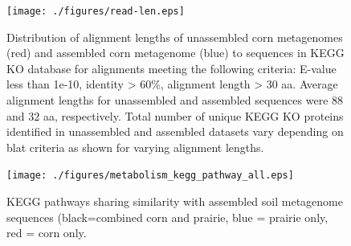 \documentclass{pnastwo}
\begin{document}
\begin{figure}
\begin{center}
\centerline{\texttt{[image: ./figures/read-len.eps]}}
\caption{Distribution of alignment lengths of unassembled corn metagenomes (red) and assembled corn metagenome (blue) to sequences in KEGG KO database for alignments meeting the following criteria:  E-value less than 1e-10, identity > 60\%, alignment length > 30 aa.  Average alignment lengths for unassembled and assembled sequences were 88 and 32 aa, respectively.   Total number of unique  KEGG KO proteins identified in unassembled and assembled datasets vary depending on blat criteria as shown for varying alignment lengths.}
\label{length-aln}
\end{center}
\end{figure}


\begin{figure}
\begin{center}
\centerline{\texttt{[image: ./figures/metabolism\_kegg\_pathway\_all.eps]}}
\caption{KEGG pathways sharing similarity with assembled soil metagenome sequences (black=combined corn and prairie, blue = prairie only, red = corn only.}
\label{kegg}
\end{center}
\end{figure}
\end{document}
